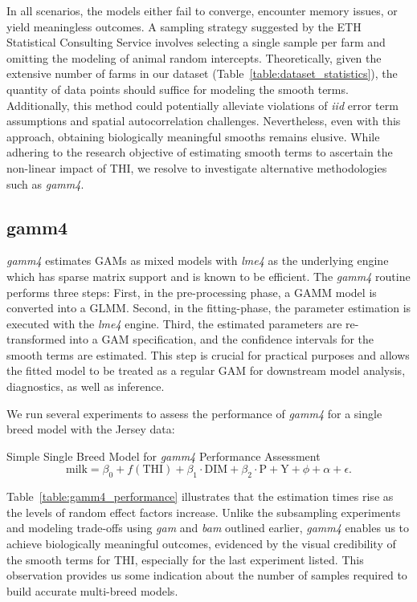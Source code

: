 In all scenarios, the models either fail to converge, encounter memory issues, or yield meaningless outcomes. A sampling strategy suggested by the ETH Statistical Consulting Service involves selecting a single sample per farm and omitting the modeling of animal random intercepts. Theoretically, given the extensive number of farms in our dataset (Table~\ref{table:dataset_statistics}), the quantity of data points should suffice for modeling the smooth terms. Additionally, this method could potentially alleviate violations of \textit{iid} error term assumptions and spatial autocorrelation challenges. Nevertheless, even with this approach, obtaining biologically meaningful smooths remains elusive. While adhering to the research objective of estimating smooth terms to ascertain the non-linear impact of THI, we resolve to investigate alternative methodologies such as \textit{gamm4}.


\subsection{gamm4}
\textit{gamm4} estimates GAMs as mixed models with \textit{lme4} as the underlying engine which has sparse matrix support and is known to be efficient. The \textit{gamm4} routine performs three steps: First, in the pre-processing phase, a GAMM model is converted into a GLMM. Second, in the fitting-phase, the parameter estimation is executed with the \textit{lme4} engine. Third, the estimated parameters are re-transformed into a GAM specification, and the confidence intervals for the smooth terms are estimated. This step is crucial for practical purposes and allows the fitted model to be treated as a regular GAM for downstream model analysis, diagnostics, as well as inference.

We run several experiments to assess the performance of \textit{gamm4} for a single breed model with the Jersey data: 
\begin{defi} Simple Single Breed Model for \textit{gamm4} Performance Assessment
    \begin{equation}\label{eq:gamm4_model}
    \text{milk} = \beta_0 + f(\text{THI}) + \beta_1 \cdot \text{DIM} + \beta_2 \cdot \text{P} + \text{Y} + \phi + \alpha + \epsilon.
\end{equation}
\end{defi}


Table~\ref{table:gamm4_performance} illustrates that the estimation times rise as the levels of random effect factors increase. Unlike the subsampling experiments and modeling trade-offs using \textit{gam} and \textit{bam} outlined earlier, \textit{gamm4} enables us to achieve biologically meaningful outcomes, evidenced by the visual credibility of the smooth terms for THI, especially for the last experiment listed. This observation provides us some indication about the number of samples required to build accurate multi-breed models.

